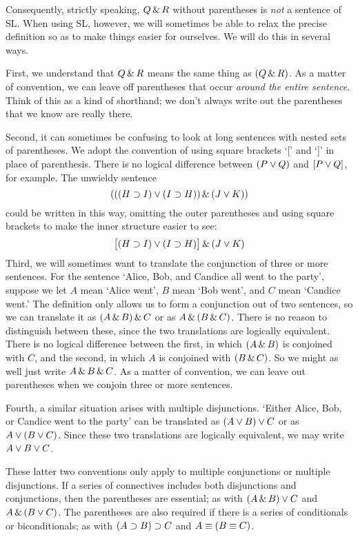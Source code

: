 Consequently, strictly speaking, $Q \,\&\, R$ without parentheses is \emph{not} a sentence of SL. When using SL, however, we will sometimes be able to relax the precise definition so as to make things easier for ourselves. We will do this in several ways.

First,  we understand that $Q \,\&\, R$ means the same thing as $(Q \,\&\, R)$. As a matter of convention, we can leave off parentheses that occur \emph{around the entire sentence}. Think of this as a kind of shorthand; we don't always write out the parentheses that we know are really there.

Second, it can sometimes be confusing to look at long sentences with nested sets of parentheses. We adopt the convention of using square brackets `[' and `]' in place of parenthesis. There is no logical difference between $(P\vee Q)$ and $[P\vee Q]$, for example. The unwieldy sentence
$$(((H \supset I) \vee (I \supset H)) \,\&\, (J \vee K))$$
could be written in this way, omitting the outer parentheses and using square brackets to make the inner structure easier to see:
$$\bigl[(H \supset I) \vee (I \supset H)\bigr] \,\&\, (J \vee K)$$
Third, we will sometimes want to translate the conjunction of three or more sentences. For the sentence `Alice, Bob, and Candice all went to the party', suppose we let $A$ mean `Alice went', $B$ mean `Bob went', and $C$ mean `Candice went.' The definition only allows us to form a conjunction out of two sentences, so we can translate it as $(A \,\&\, B) \,\&\, C$ or as $A \,\&\, (B \,\&\, C)$. There is no reason to distinguish between these, since the two translations are logically equivalent. There is no logical difference between the first, in which $(A \,\&\, B)$ is conjoined with $C$, and the second, in which $A$ is conjoined with $(B \,\&\, C)$.  So we might as well just write $A \,\&\, B \,\&\, C$. As a matter of convention, we can leave out parentheses when we conjoin three or more sentences.

Fourth, a similar situation arises with multiple disjunctions. `Either Alice, Bob, or Candice went to the party' can be translated as $(A \vee B) \vee C$ or as $A \vee (B \vee C)$. Since these two translations are logically equivalent, we may write $A \vee B \vee C$.

These latter two conventions only apply to multiple conjunctions or multiple  disjunctions. If a series of connectives includes both disjunctions and conjunctions, then the parentheses are essential; as with $(A \,\&\, B) \vee C$ and $A \,\&\, (B \vee C)$. The parentheses are also required if there is a series of conditionals or biconditionals; as with $(A \supset B) \supset C$ and $A \equiv (B \equiv C)$.


